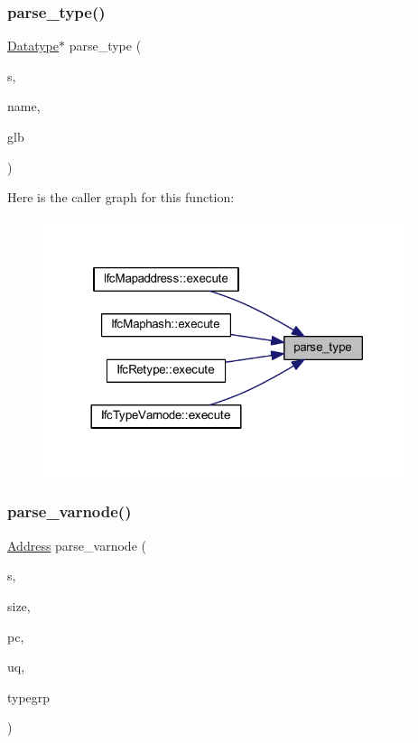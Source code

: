 \mbox{\label{grammar_8hh_aa7c562a7402251d5c2145074da280ae1}} 
\subsubsection{\texorpdfstring{parse\_type()}{parse\_type()}}
{\footnotesize\ttfamily \mbox{\hyperlink{class_datatype}{Datatype}}$\ast$ parse\+\_\+type (\begin{DoxyParamCaption}\item[{istream \&}]{s,  }\item[{string \&}]{name,  }\item[{\mbox{\hyperlink{class_architecture}{Architecture}} $\ast$}]{glb }\end{DoxyParamCaption})}

Here is the caller graph for this function\+:
\nopagebreak
\begin{figure}[H]
\begin{center}
\leavevmode
\includegraphics[width=305pt]{grammar_8hh_aa7c562a7402251d5c2145074da280ae1_icgraph}
\end{center}
\end{figure}
\mbox{\label{grammar_8hh_a058251f048324838196c4589a82738ee}} 
\subsubsection{\texorpdfstring{parse\_varnode()}{parse\_varnode()}}
{\footnotesize\ttfamily \mbox{\hyperlink{class_address}{Address}} parse\+\_\+varnode (\begin{DoxyParamCaption}\item[{istream \&}]{s,  }\item[{int4 \&}]{size,  }\item[{\mbox{\hyperlink{class_address}{Address}} \&}]{pc,  }\item[{uintm \&}]{uq,  }\item[{const \mbox{\hyperlink{class_type_factory}{Type\+Factory}} \&}]{typegrp }\end{DoxyParamCaption})}

